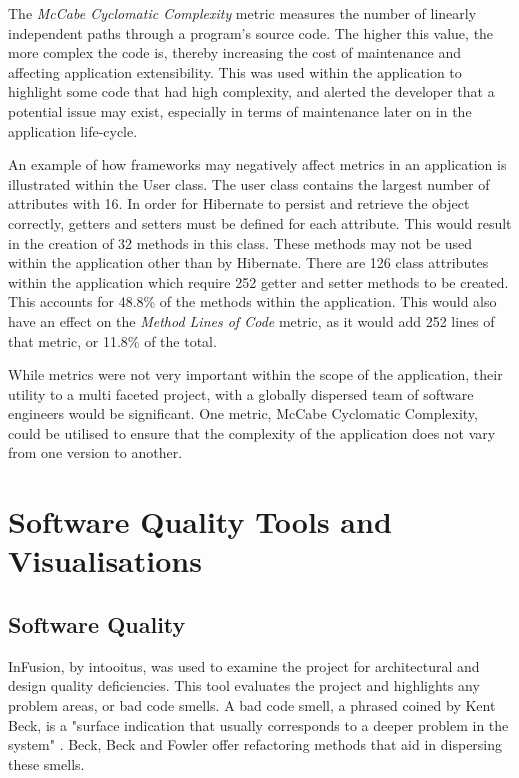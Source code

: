 The \textit{McCabe Cyclomatic Complexity} metric measures the number of linearly independent paths through a program's source code. The higher this value, the more complex the code is, thereby increasing the cost of maintenance and affecting application extensibility. This was used within the application to highlight some code that had high complexity, and alerted the developer that a potential issue may exist, especially in terms of maintenance later on in the application life-cycle.

An example of how frameworks may negatively affect metrics in an application is illustrated within the User class. The user class contains the largest number of attributes with 16. In order for Hibernate to persist and retrieve the object correctly, getters and setters must be defined for each attribute. This would result in the creation of 32 methods in this class. These methods may not be used within the application other than by Hibernate. There are 126 class attributes within the application which require 252 getter and setter methods to be created. This accounts for 48.8\% of the methods within the application. This would also have an effect on the \textit{Method Lines of Code} metric, as it would add 252 lines of that metric, or 11.8\% of the total. 

While metrics were not very important within the scope of the application, their utility to a multi faceted project, with a globally dispersed team of software engineers would be significant. One metric, McCabe Cyclomatic Complexity, could be utilised to ensure that the complexity of the application does not vary from one version to another. 

\section{Software Quality Tools and Visualisations}

\subsection{Software Quality}

InFusion, by intooitus, was used to examine the project for architectural and design quality deficiencies. This tool evaluates the project and highlights any problem areas, or bad code smells. A bad code smell, a phrased coined by Kent Beck, is a "surface indication that usually corresponds to a deeper problem in the system" \parencite{fowler}. Beck, Beck and Fowler offer refactoring methods that aid in dispersing these smells. 

